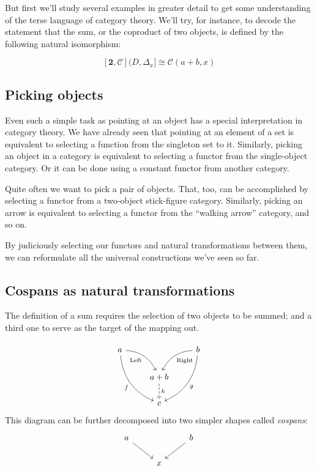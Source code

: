 \documentclass[DaoFP]{subfiles}
\begin{document}
But first we'll study several examples in greater detail to get some understanding of the terse language of category theory. We'll try, for instance, to decode the statement that the sum, or the coproduct of two objects, is defined by the following natural isomorphism:

\[ [\mathbf{2}, \mathcal{C}](D, \Delta_x]  \cong \mathcal{C}(a + b, x) \]



\subsection{Picking objects}

Even such a simple task as pointing at an object has a special interpretation in category theory. We have already seen that pointing at an element of a set is equivalent to selecting a function from the singleton set to it. Similarly, picking an object in a category is equivalent to selecting a functor from the single-object category. Or it can be done using a constant functor from another category. 

Quite often we want to pick a pair of objects. That, too, can be accomplished by selecting a functor from a two-object stick-figure category. Similarly, picking an arrow is equivalent to selecting a functor from the ``walking arrow'' category, and so on.

By judiciously selecting our functors and natural transformations between them, we can reformulate all the universal constructions we've seen so far.

\subsection{Cospans as natural transformations}

The definition of a sum requires the selection of two objects to be summed; and a third one to serve as the target of the mapping out.

\[
 \begin{tikzcd}
 a
 \arrow[dr,  bend left, "\text{Left}"']
 \arrow[ddr, bend right, "f"']
 && b
 \arrow[dl, bend right, "\text{Right}"]
 \arrow[ddl, bend left, "g"]
 \\
&a + b
\arrow[d, dashed, "h"]
\\
& c
 \end{tikzcd}
\]
This diagram can be further decomposed into two simpler shapes called \emph{cospans}:
\[
 \begin{tikzcd}
 a
 \arrow[dr, ""']
 && b
 \arrow[dl, ""]
 \\
 & x
 \end{tikzcd}
\]
\end{document}
